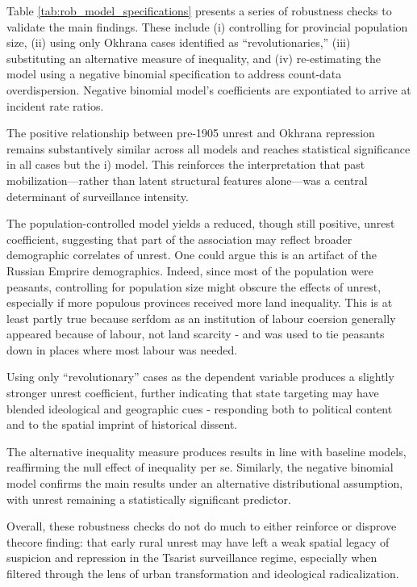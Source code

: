 \documentclass[11pt]{scrarticle}
\begin{document}
Table \ref{tab:rob_model_specifications} presents a series of robustness checks to validate the main findings. These include (i) controlling for provincial population size, (ii) using only Okhrana cases identified as “revolutionaries,” (iii) substituting an alternative measure of inequality, and (iv) re-estimating the model using a negative binomial specification to address count-data overdispersion. Negative binomial model's coefficients are expontiated to arrive at incident rate ratios. 

The positive relationship between pre-1905 unrest and Okhrana repression remains substantively similar across all models and reaches statistical significance in all cases but the i) model. This reinforces the interpretation that past mobilization—rather than latent structural features alone—was a central determinant of surveillance intensity.

The population-controlled model yields a reduced, though still positive, unrest coefficient, suggesting that part of the association may reflect broader demographic correlates of unrest. One could argue this is an artifact of the Russian Emprire demographics. Indeed, since most of the population were peasants, controlling for population size might obscure the effects of unrest, especially if more populous provinces received more land inequality. This is at least partly true because serfdom as an institution of labour coersion generally appeared because of labour, not land scarcity - and was used to tie peasants down in places where most labour was needed. 

Using only “revolutionary” cases as the dependent variable produces a slightly stronger unrest coefficient, further indicating that state targeting may have blended ideological and geographic cues - responding both to political content and to the spatial imprint of historical dissent.

The alternative inequality measure produces results in line with baseline models, reaffirming the null effect of inequality per se. Similarly, the negative binomial model confirms the main results under an alternative distributional assumption, with unrest remaining a statistically significant predictor.

Overall, these robustness checks do not do much to either reinforce or disprove thecore finding: that early rural unrest may have left a weak spatial legacy of suspicion and repression in the Tsarist surveillance regime, especially when filtered through the lens of urban transformation and ideological radicalization.
\end{document}
